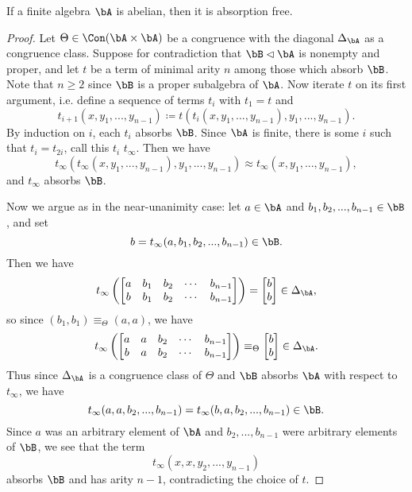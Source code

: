 \begin{thm}\label{abelian-haf} If a finite algebra $\bA$ is abelian, then it is absorption free.
\end{thm}
\begin{proof} Let $\Theta \in \Con(\bA \times \bA)$ be a congruence with the diagonal $\Delta_{\bA}$ as a congruence class. Suppose for contradiction that $\bB \lhd \bA$ is nonempty and proper, and let $t$ be a term of minimal arity $n$ among those which absorb $\bB$. Note that $n \ge 2$ since $\bB$ is a proper subalgebra of $\bA$. Now iterate $t$ on its first argument, i.e. define a sequence of terms $t_i$ with $t_1 = t$ and
\[
t_{i+1}(x,y_1, ..., y_{n-1}) \coloneqq t(t_i(x,y_1,...,y_{n-1}),y_1,...,y_{n-1}).
\]
By induction on $i$, each $t_i$ absorbs $\bB$. Since $\bA$ is finite, there is some $i$ such that $t_i = t_{2i}$, call this $t_i$ $t_\infty$. Then we have
\[
t_\infty(t_\infty(x,y_1, ..., y_{n-1}),y_1, ..., y_{n-1}) \approx t_\infty(x,y_1, ..., y_{n-1}),
\]
and $t_\infty$ absorbs $\bB$.

Now we argue as in the near-unanimity case: let $a \in \bA$ and $b_1,b_2,...,b_{n-1} \in \bB$, and set
\[
b = t_\infty(a,b_1,b_2,...,b_{n-1}) \in \bB.
\]
Then we have
\[
t_\infty\left(\begin{bmatrix} a & b_1 & b_2 & \cdots & b_{n-1}\\ b & b_1 & b_2 & \cdots & b_{n-1}\end{bmatrix}\right) = \begin{bmatrix} b\\ b\end{bmatrix} \in \Delta_\bA,
\]
so since $(b_1,b_1) \equiv_\Theta (a,a)$, we have
\[
t_\infty\left(\begin{bmatrix} a & a & b_2 & \cdots & b_{n-1}\\ b & a & b_2 & \cdots & b_{n-1}\end{bmatrix}\right) \equiv_\Theta \begin{bmatrix} b\\ b\end{bmatrix} \in \Delta_{\bA}.
\]
Thus since $\Delta_\bA$ is a congruence class of $\Theta$ and $\bB$ absorbs $\bA$ with respect to $t_\infty$, we have
\[
t_{\infty}(a,a,b_2,...,b_{n-1}) = t_\infty(b,a,b_2,...,b_{n-1}) \in \bB.
\]
Since $a$ was an arbitrary element of $\bA$ and $b_2, ..., b_{n-1}$ were arbitrary elements of $\bB$, we see that the term
\[
t_\infty(x,x,y_2,...,y_{n-1})
\]
absorbs $\bB$ and has arity $n-1$, contradicting the choice of $t$.
\end{proof}

